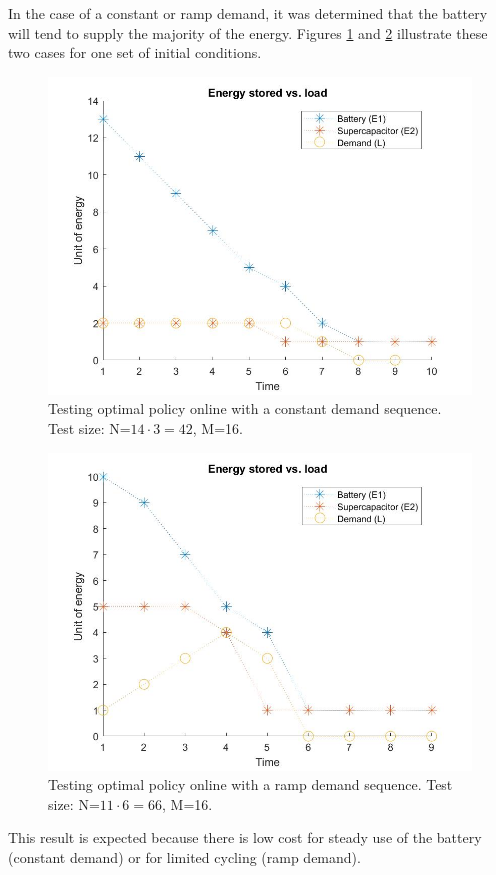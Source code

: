 \documentclass[conference]{IEEEtran}
\begin{document}
In the case of a constant or ramp demand, it was determined that the battery will tend to supply the majority of the energy. Figures \ref{fig:ConstDemand} and \ref{fig:RampDemand} illustrate these two cases for one set of initial conditions.
\begin{figure}[htbp]
\centerline{\includegraphics[scale=0.25]{EnergyStoredvsload_ConstantLoad(E1_max=13,E2_max=2).jpg}}
\caption{Testing optimal policy online with a constant demand sequence. Test size: N=$14\cdot3=42$, M=16.}
\label{fig:ConstDemand}
\end{figure}
\begin{figure}[htbp]
\centerline{\includegraphics[scale=0.25]{EnergyStoredvsload_RampLoad(E1_max=10,E2_max=5).jpg}}
\caption{Testing optimal policy online with a ramp demand sequence. Test size: N=$11\cdot6=66$, M=16.}
\label{fig:RampDemand}
\end{figure} This result is expected because there is low cost for steady use of the battery (constant demand) or for limited cycling (ramp demand).
\end{document}
